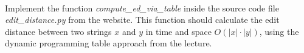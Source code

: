  \\
Implement the function \emph{compute\_ed\_via\_table} inside the source code file \emph{edit\_distance.py} from the website.
This function should calculate the edit distance between two strings $x$ and $y$ in time and space $O(|x|\cdot|y|)$, using the dynamic programming table approach from the lecture.
